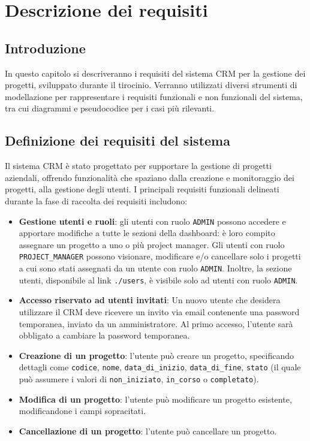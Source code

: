 \documentclass[target=bach,aauheader=,style=]{thud}
\begin{document}
\chapter{Descrizione dei requisiti}

\section{Introduzione}
In questo capitolo si descriveranno i requisiti del sistema CRM per la gestione dei progetti, sviluppato durante il tirocinio. Verranno utilizzati diversi strumenti di modellazione per rappresentare i requisiti funzionali e non funzionali del sistema, tra cui diagrammi e pseudocodice per i casi più rilevanti.

\section{Definizione dei requisiti del sistema}
Il sistema CRM è stato progettato per supportare la gestione di progetti aziendali, offrendo funzionalità che spaziano dalla creazione e monitoraggio dei progetti, alla gestione degli utenti. I principali requisiti funzionali delineati durante la fase di raccolta dei requisiti includono:

\begin{itemize}
    \item \textbf{Gestione utenti e ruoli}: gli utenti con ruolo \texttt{ADMIN} possono accedere e apportare modifiche a tutte le sezioni della dashboard: è loro compito assegnare un progetto a uno o più project manager. Gli utenti con ruolo \texttt{PROJECT\_MANAGER} possono visionare, modificare e/o cancellare solo i progetti a cui sono stati assegnati da un utente con ruolo \texttt{ADMIN}. Inoltre, la sezione utenti, disponibile al link \texttt{./users}, è visibile solo ad utenti con ruolo \texttt{ADMIN}.
    \item \textbf{Accesso riservato ad utenti invitati}: Un nuovo utente che desidera utilizzare il CRM deve ricevere un invito via email contenente una password temporanea, inviato da un amministratore. Al primo accesso, l'utente sarà obbligato a cambiare la password temporanea.
    \item \textbf{Creazione di un progetto}: l'utente può creare un progetto, specificando dettagli come \texttt{codice}, \texttt{nome}, \texttt{data\_di\_inizio}, \texttt{data\_di\_fine}, \texttt{stato} (il quale può assumere i valori di \texttt{non\_iniziato}, \texttt{in\_corso} o \texttt{completato}).
    \item \textbf{Modifica di un progetto}: l'utente può modificare un progetto esistente, modificandone i campi sopracitati.
    \item \textbf{Cancellazione di un progetto}: l'utente può cancellare un progetto. 
\end{itemize}
\end{document}
